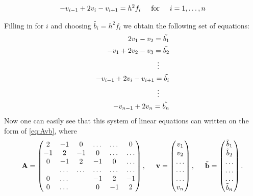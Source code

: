 \documentclass[11pt,a4paper,english]{article}
\newcommand{\ve}[1]{\mathbf{#1}} %
\newcommand{\spac}{\hspace{5mm}}
\begin{document}
\begin{gather*}
   -v_{i-1}+2v_{i}-v_{i+1}=h^2 f_i \spac \mathrm{for} \spac i=1,\dots, n 
\end{gather*}

Filling in for $i$ and choosing $\tilde{b_i} = h^2 f_i$ we obtain the following set of equations: 
\begin{align*}
	2v_{1}-v_{2}=\tilde{b_1} \\
	-v_{1}+2v_{2}-v_{3}=\tilde{b_2} \\
	\vdots \spac \\
	-v_{i-1}+2v_{i}-v_{i+1}=\tilde{b_i} \\
	\vdots \spac  \\ 
	-v_{n-1}+2v_{n}=\tilde{b_n} \\
\end{align*}
Now one can easily see that this system of linear equations can written on the form of \eqref{eq:Avb},
where 
\begin{gather*}
    \ve{A} = \begin{pmatrix}%
                           2& -1& 0 &\dots   & \dots &0 \\
                           -1 & 2 & -1 &0 &\dots &\dots \\
                           0&-1 &2 & -1 & 0 & \dots \\
                           & \dots   & \dots &\dots   &\dots & \dots \\
                           0&\dots   &  &-1 &2& -1 \\
                           0&\dots    &  & 0  &-1 & 2 \\
                      \end{pmatrix},\spac \ve{v} = \begin{pmatrix}
                           v_1\\
                           v_2\\
                           \dots \\
                          \dots  \\
                          \dots \\
                           v_n\\
                      \end{pmatrix},
  \spac \tilde{\ve{b}} = \begin{pmatrix}
                           \tilde{b}_1\\
                           \tilde{b}_2\\
                           \dots \\
                           \dots \\
                          \dots \\
                           \tilde{b}_n\\
                      \end{pmatrix}.
\end{gather*}
\end{document}

